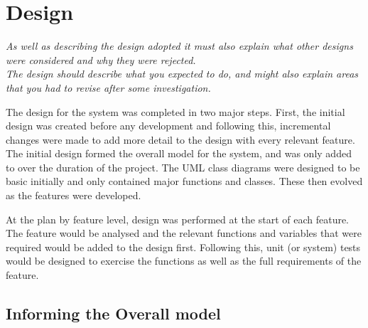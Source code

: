 \chapter{Design}

\textit{ As well as describing the design adopted it must also explain what other designs were considered and why they were rejected.\\
The design should describe what you expected to do, and might also explain areas that you had to revise after some investigation.}

The design for the system was completed in two major steps. First, the initial design was created before any development and following this, incremental changes were made to add  more detail to the design with every relevant feature. The initial design formed the overall model for the system, and was only added to over the duration of the project. The UML class diagrams were designed to be basic initially and only contained major functions and classes. These then evolved as the features were developed.

At the plan by feature level, design was performed at the start of each feature. The feature would be analysed and the relevant functions and variables that were required would be added to the design first. Following this, unit (or system) tests would be designed to exercise the functions as well as the full requirements of the feature.


\section{Informing the Overall model}
